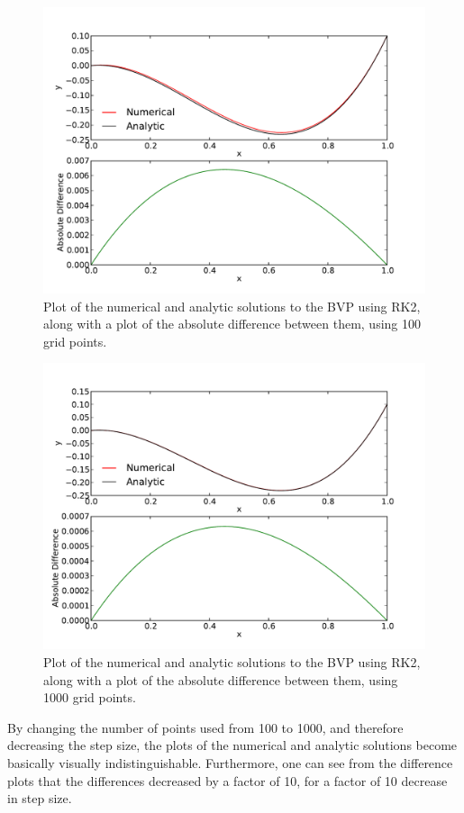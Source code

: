 \documentclass[11pt,letterpaper]{article}
\begin{document}
\begin{figure}[!htb]\centering
  \includegraphics[width=1\textwidth]{BVP-RK}
  \caption{Plot of the numerical and analytic solutions to the BVP using RK2, along with a plot of the absolute difference between them, using 100 grid points.}
  \end{figure}

\begin{figure}[!htb]\centering
  \includegraphics[width=1\textwidth]{BVP-RK2}
  \caption{Plot of the numerical and analytic solutions to the BVP using RK2, along with a plot of the absolute difference between them, using 1000 grid points.}
  \end{figure}

By changing the number of points used from 100 to 1000, and therefore decreasing the step size, the plots of the numerical and analytic solutions become basically visually indistinguishable. Furthermore, one can see from the difference plots that the differences decreased by a factor of 10, for a factor of 10 decrease in step size.
\end{document}
